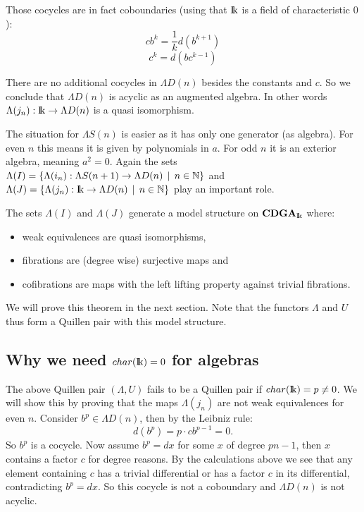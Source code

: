 Those cocycles are in fact coboundaries (using that $\mathrm{I\!k}$ is a field of characteristic $0$):
$$ c b^k = \frac{1}{k} d(b^{k+1}) $$
$$ c^k = d(b c^{k-1}) $$

There are no additional cocycles in $\Lambda D(n)$ besides the constants and $c$. So we conclude that $\Lambda D(n)$ is acyclic as an augmented algebra. In other words $\Lambda(j_n): \mathrm{I\!k} \to \Lambda D(n)$ is a quasi isomorphism.

The situation for $\Lambda S(n)$ is easier as it has only one generator (as algebra). For even $n$ this means it is given by polynomials in $a$. For odd $n$ it is an exterior algebra, meaning $a^2 = 0$. Again the sets $\Lambda(I) = \{ \Lambda(i_n) : \Lambda S(n+1) \to \Lambda D(n) \,\mid\, n \in \mathbb{N}\}$ and $\Lambda(J) = \{ \Lambda(j_n) : \mathrm{I\!k} \to \Lambda D(n) \,\mid\, n \in \mathbb{N}\}$ play an important role.

\begin{theorem}
	The sets $\Lambda(I)$ and $\Lambda(J)$ generate a model structure on $\mathbf{CDGA}_{\mathrm{I\!k}}$ where:
	\begin{itemize}
		\item weak equivalences are quasi isomorphisms,
		\item fibrations are (degree wise) surjective maps and
		\item cofibrations are maps with the left lifting property against trivial fibrations.
	\end{itemize}
\end{theorem}

We will prove this theorem in the next section. Note that the functors $\Lambda$ and $U$ thus form a Quillen pair with this model structure.

\subsection{Why we need $char({\mathrm{I\!k}}) = 0$ for algebras}
The above Quillen pair $(\Lambda, U)$ fails to be a Quillen pair if \linebreak $char({\mathrm{I\!k}}) = p \neq 0$. We will show this by proving that the maps $\Lambda(j_n)$ are not weak equivalences for even $n$. Consider $b^p \in \Lambda D(n)$, then by the Leibniz rule:
$$ d(b^p) = p \cdot c b^{p-1} = 0. $$
So $b^p$ is a cocycle. Now assume $b^p = d x$ for some $x$ of degree $p n - 1$, then $x$ contains a factor $c$ for degree reasons. By the calculations above we see that any element containing $c$ has a trivial differential or has a factor $c$ in its differential, contradicting $b^p =  d x$. So this cocycle is not a coboundary and $\Lambda D(n)$ is not acyclic.
